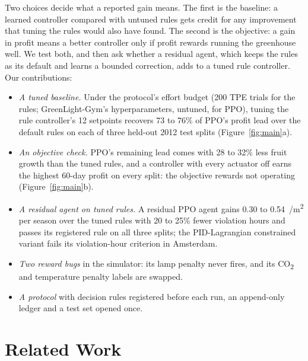 \documentclass[letterpaper]{article} %
\newcommand{\cotwo}{CO\textsubscript{2}}
\newcommand{\eurm}{\texteuro/m\textsuperscript{2}}
\begin{document}
Two choices decide what a reported gain means. The first is the baseline: a learned controller compared with untuned rules gets credit for any improvement that tuning the rules would also have found. The second is the objective: a gain in profit means a better controller only if profit rewards running the greenhouse well. We test both, and then ask whether a residual agent, which keeps the rules as its default and learns a bounded correction, adds to a tuned rule controller. Our contributions:
\begin{itemize}
\item \emph{A tuned baseline.} Under the protocol's effort budget (200 TPE trials for the rules; GreenLight-Gym's hyperparameters, untuned, for PPO), tuning the rule controller's 12 setpoints recovers 73 to 76\% of PPO's profit lead over the default rules on each of three held-out 2012 test splits (Figure~\ref{fig:main}a).
\item \emph{An objective check.} PPO's remaining lead comes with 28 to 32\% less fruit growth than the tuned rules, and a controller with every actuator off earns the highest 60-day profit on every split: the objective rewards not operating (Figure~\ref{fig:main}b).
\item \emph{A residual agent on tuned rules.} A residual PPO agent gains 0.30 to 0.54~\eurm{} per season over the tuned rules with 20 to 25\% fewer violation hours and passes its registered rule on all three splits; the PID-Lagrangian constrained variant fails its violation-hour criterion in Amsterdam.
\item \emph{Two reward bugs} in the simulator: its lamp penalty never fires, and its \cotwo{} and temperature penalty labels are swapped.
\item \emph{A protocol} with decision rules registered before each run, an append-only ledger and a test set opened once.
\end{itemize}

\section{Related Work}
\end{document}
